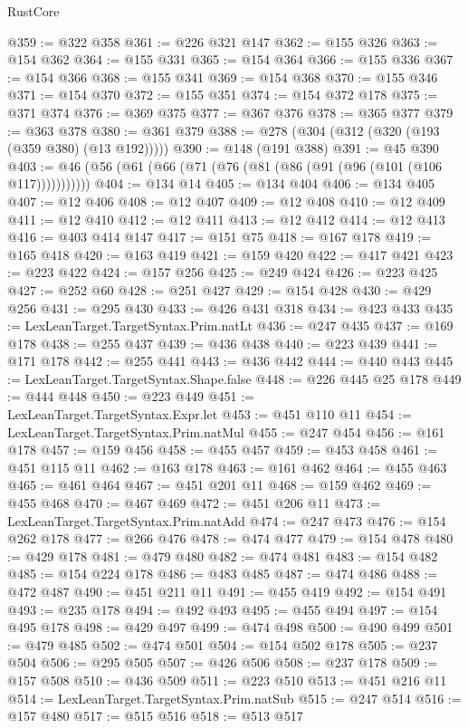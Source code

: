 \begin{lexlean}{RustCore}
\begin{coremodule}
@359 := @322 @358
@361 := @226 @321 @147
@362 := @155 @326
@363 := @154 @362
@364 := @155 @331
@365 := @154 @364
@366 := @155 @336
@367 := @154 @366
@368 := @155 @341
@369 := @154 @368
@370 := @155 @346
@371 := @154 @370
@372 := @155 @351
@374 := @154 @372 @178
@375 := @371 @374
@376 := @369 @375
@377 := @367 @376
@378 := @365 @377
@379 := @363 @378
@380 := @361 @379
@388 := @278 (@304 (@312 (@320 (@193 (@359 @380) (@13 @192)))))
@390 := @148 (@191 @388)
@391 := @45 @390
@403 := @46 (@56 (@61 (@66 (@71 (@76 (@81 (@86 (@91 (@96 (@101 (@106 @117)))))))))))
@404 := @134 @14
@405 := @134 @404
@406 := @134 @405
@407 := @12 @406
@408 := @12 @407
@409 := @12 @408
@410 := @12 @409
@411 := @12 @410
@412 := @12 @411
@413 := @12 @412
@414 := @12 @413
@416 := @403 @414 @147
@417 := @151 @75
@418 := @167 @178
@419 := @165 @418
@420 := @163 @419
@421 := @159 @420
@422 := @417 @421
@423 := @223 @422
@424 := @157 @256
@425 := @249 @424
@426 := @223 @425
@427 := @252 @60
@428 := @251 @427
@429 := @154 @428
@430 := @429 @256
@431 := @295 @430
@433 := @426 @431 @318
@434 := @423 @433
@435 := LexLeanTarget.TargetSyntax.Prim.natLt
@436 := @247 @435
@437 := @169 @178
@438 := @255 @437
@439 := @436 @438
@440 := @223 @439
@441 := @171 @178
@442 := @255 @441
@443 := @436 @442
@444 := @440 @443
@445 := LexLeanTarget.TargetSyntax.Shape.false
@448 := @226 @445 @25 @178
@449 := @444 @448
@450 := @223 @449
@451 := LexLeanTarget.TargetSyntax.Expr.let
@453 := @451 @110 @11
@454 := LexLeanTarget.TargetSyntax.Prim.natMul
@455 := @247 @454
@456 := @161 @178
@457 := @159 @456
@458 := @455 @457
@459 := @453 @458
@461 := @451 @115 @11
@462 := @163 @178
@463 := @161 @462
@464 := @455 @463
@465 := @461 @464
@467 := @451 @201 @11
@468 := @159 @462
@469 := @455 @468
@470 := @467 @469
@472 := @451 @206 @11
@473 := LexLeanTarget.TargetSyntax.Prim.natAdd
@474 := @247 @473
@476 := @154 @262 @178
@477 := @266 @476
@478 := @474 @477
@479 := @154 @478
@480 := @429 @178
@481 := @479 @480
@482 := @474 @481
@483 := @154 @482
@485 := @154 @224 @178
@486 := @483 @485
@487 := @474 @486
@488 := @472 @487
@490 := @451 @211 @11
@491 := @455 @419
@492 := @154 @491
@493 := @235 @178
@494 := @492 @493
@495 := @455 @494
@497 := @154 @495 @178
@498 := @429 @497
@499 := @474 @498
@500 := @490 @499
@501 := @479 @485
@502 := @474 @501
@504 := @154 @502 @178
@505 := @237 @504
@506 := @295 @505
@507 := @426 @506
@508 := @237 @178
@509 := @157 @508
@510 := @436 @509
@511 := @223 @510
@513 := @451 @216 @11
@514 := LexLeanTarget.TargetSyntax.Prim.natSub
@515 := @247 @514
@516 := @157 @480
@517 := @515 @516
@518 := @513 @517

\end{coremodule}
\end{lexlean}
